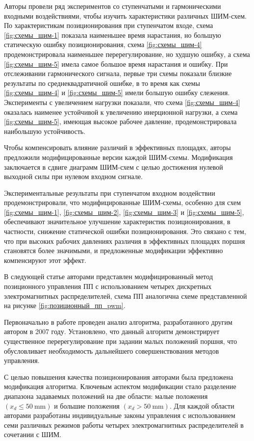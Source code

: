 Авторы провели ряд экспериментов со ступенчатыми и гармоническими входными воздействиями, чтобы изучить характеристики
различных ШИМ-схем. По характеристикам позиционирования при ступенчатом входе, схема \cref*{fig:схемы_шим-1} показала наименьшее время
нарастания, но большую статическую ошибку позиционирования, схема \cref*{fig:схемы_шим-4} продемонстрировала наименьшее перерегулирование,
но худшую ошибку, а схема \cref*{fig:схемы_шим-5} имела самое большое время нарастания и ошибку.
При отслеживании гармонического сигнала, первые три схемы показали близкие результаты по среднеквадратичной
ошибке, в то время как схемы \cref*{fig:схемы_шим-4} и \cref*{fig:схемы_шим-5} имели большую ошибку слежения. Эксперименты с увеличением нагрузки показали,
что схема \cref*{fig:схемы_шим-4}
оказалась наименее устойчивой к увеличению инерционной нагрузки, а схема \cref*{fig:схемы_шим-5}, имеющая высокое рабочее давление,
продемонстрировала наибольшую
устойчивость.

Чтобы компенсировать влияние различий в эффективных площадях, авторы предложили модифицированные версии каждой ШИМ-схемы.
Модификация заключается в сдвиге диаграмм ШИМ-схем с целью достижения нулевой выходной силы при нулевом входном сигнале.

Экспериментальные результаты при ступенчатом входном воздействии продемонстрировали, что модифицированные ШИМ-схемы, особенно для схем \cref*{fig:схемы_шим-1},
\cref*{fig:схемы_шим-2}, \cref*{fig:схемы_шим-3} и \cref*{fig:схемы_шим-5}, обеспечивают значительное улучшение характеристик позиционирования,
в частности, снижение статической ошибки позиционирования. Это связано с тем, что при высоких рабочих давлениях различия в эффективных площадях поршня
становятся более значимыми, и предложенные модификации эффективно компенсируют этот эффект.

В следующей статье \cite*{Tran:pwm} авторами представлен модифицированный метод позиционного управления
ПП с использованием четырех дискретных электромагнитных распределителей, схема ПП аналогична схеме
представленной на рисунке \cref*{fig:позиционный_пп_pwm}.

Первоначально в работе проведен анализ алгоритма, разработанного другим автором \cite*{Truong}
в 2007 году. Установлено, что данный алгоритм демонстрирует существенное
перерегулирование при задании малых положений поршня, что обусловливает необходимость
дальнейшего совершенствования методов управления.

С целью повышения качества позиционирования авторами была предложена модификация
алгоритма. Ключевым аспектом модификации стало разделение диапазона задаваемых
положений на две области: малые положения $(x_d \leqslant \text{50}~\si{\milli\metre})$
и большие положения $(x_d > \text{50}~\si{\milli\metre})$.
Для каждой области авторами разработаны индивидуальные законы управления с использованием
семи различных режимов работы четырех электромагнитных распределителей в сочетании с ШИМ.

